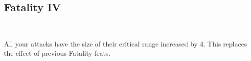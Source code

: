 \subsection*{Fatality IV}\label{feat:fatality4}
 \\

All your attacks have the size of their critical range increased by 4. This
replaces the effect of previous Fatality feats.
